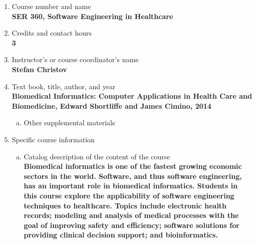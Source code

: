 \label{SER360}  %
\begin{enumerate}[1.]
\item Course number and name\\
  {\bfseries
    SER 360, Software Engineering in Healthcare
  }
  
\item Credits and contact hours\\
  {\bfseries
    3  %
  }

\item Instructor's or course coordinator's name\\
  {\bfseries
    Stefan Christov
  }

\item Text book, title, author, and year\\
  {\bfseries
    Biomedical Informatics: Computer Applications in Health Care and Biomedicine, Edward Shortliffe and James Cimino, 2014
  }
\begin{enumerate}[a.]
\item Other supplemental materials\\
  {\bfseries
    
  }
\end{enumerate}

\item Specific course information
\begin{enumerate}[a.]  
\item Catalog description of the content of the course\\
  {\bfseries
    Biomedical informatics is one of the fastest growing economic sectors in the world. Software, and thus software engineering, has an important role in biomedical informatics. Students in this course explore the applicability of software engineering techniques to healthcare. Topics include electronic health records; modeling and analysis of medical processes with the goal of improving safety and efficiency; software solutions for providing clinical decision support; and bioinformatics.
  }


\end{enumerate}
\end{enumerate}
